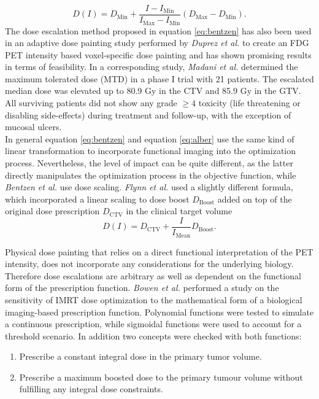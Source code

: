 \begin{itemize}
\begin{equation}\label{eq:bentzen}
D(I) = D_{\mathrm{Min}} + \frac{I-I_{\mathrm{Min}}}{I_{\mathrm{Max}}-I_{\mathrm{Min}}}\left(D_{\mathrm{Max}}-D_{\mathrm{Min}}\right).
\end{equation}
The dose escalation method proposed in equation \ref{eq:bentzen} has also been used in an adaptive dose painting study performed by \textit{Duprez et al.} \cite{pmid20643512} to create an FDG PET intensity based voxel-specific dose painting and has shown promising results in terms of feasibility. In a corresponding study, \textit{Madani et al.} \cite{pmid21742392} determined the maximum tolerated dose (MTD) in a phase I trial with 21 patients. The escalated median dose was elevated up to 80.9 Gy in the CTV and 85.9 Gy in the GTV. All surviving patients did not show any grade $\geq 4$ toxicity (life threatening or disabling side-effects) during treatment and follow-up, with the exception of mucosal ulcers. \\In general equation \ref{eq:bentzen} and equation \ref{eq:alber} use the same kind of linear transformation to incorporate functional imaging into the optimization process. Nevertheless, the level of impact can be quite different, as the latter directly manipulates the optimization process in the objective function, while \textit{Bentzen et al.} use dose scaling. \textit{Flynn et al.} \cite{pmid18635895} used a slightly different formula, which incorporated a linear scaling to dose boost $D_{\mathrm{Boost}}$ added on top of the original dose prescription $D_\mathrm{CTV}$ in the clinical target volume
\begin{equation}
D(I) = D_\mathrm{CTV} + \frac{I}{I_\mathrm{Mean}}D_\mathrm{Boost}.
\end{equation}
\end{itemize}
Physical dose painting that relies on a direct functional interpretation of the PET intensity, does not incorporate any considerations for the underlying biology. Therefore dose escalations are arbitrary as well as dependent on the functional form of the prescription function. \textit{Bowen et al.} \cite{pmid19218733} performed a study on the sensitivity of IMRT dose optimization to the mathematical form of a biological imaging-based prescription function. Polynomial functions were tested to simulate a continuous prescription, while sigmoidal functions were used to account for a threshold scenario. In addition two concepts were checked with both functions:
\begin{enumerate}
\item Prescribe a constant integral dose in the primary tumor volume.
\item Prescribe a maximum boosted dose to the primary tumour volume without fulfilling any integral dose constraints.
\end{enumerate}
